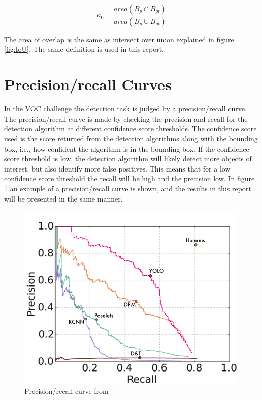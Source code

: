 \begin{equation*}
    a_0 = \frac{area(B_p \cap B_{gt}) }{area(B_p \cup B_{gt})}
\end{equation*}

The area of overlap is the same as intersect over union explained in figure \ref{fig:IoU}. The same definition is used in this report.




\section{Precision/recall Curves}

In the VOC challenge \citep{Everinghama} the detection task is judged by a precision/recall curve. The precision/recall curve is made by checking the precision and recall for the detection algorithm at different confidence score thresholds. The confidence score used is the score returned from the detection algorithms along with the bounding box, i.e., how confident the algorithm is in the bounding box. If the confidence score threshold is low, the detection algorithm will likely detect more objects of interest, but also identify more false positives. This means that for a low confidence score threshold the recall will be high and the precision low. In figure \ref{fig:yolo_prec_recall} an example of a precision/recall curve is shown, and the results in this report will be presented in the same manner. 

\begin{figure}[h!]
    \centering
    \includegraphics[scale=0.4]{fig/yolo_prec_recall.png} 
    \caption{Precision/recall curve from \citep{YOLOv1}}
    \label{fig:yolo_prec_recall}
\end{figure}

